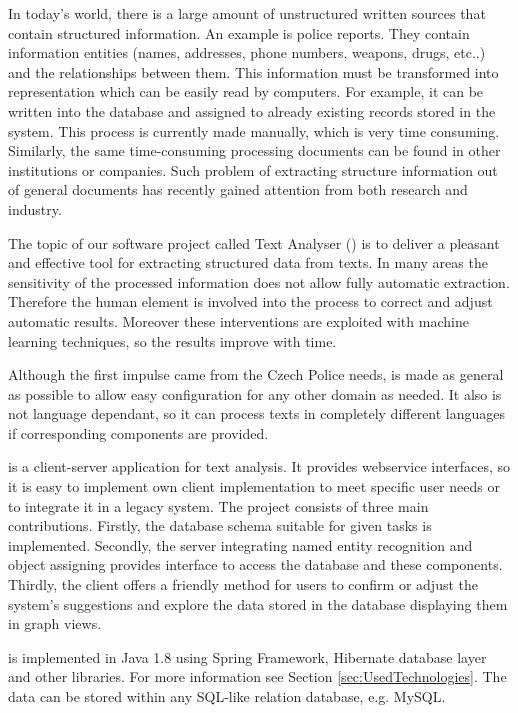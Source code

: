 
In today's world, there is a large amount of unstructured written sources that contain structured information. An example is police reports. They contain
information entities (names, addresses, phone numbers, weapons, drugs, etc..)
and the relationships between them. This information must be transformed into
representation which can be easily read by computers. For example, it can be
written into the database and assigned to already existing records stored in
the system. This process is currently made manually, which is very time 
consuming. Similarly, the same time-consuming processing documents can be found
in other institutions or companies. Such problem of extracting structure
information out of general documents has recently gained attention from both
research and industry.

The topic of our software project called Text Analyser (\textan{}) is to
deliver a pleasant and effective tool for extracting structured data from texts.
In many areas the sensitivity of the processed information does not allow fully
automatic extraction. Therefore the human element is involved into the process
to correct and adjust automatic results. Moreover these interventions are
exploited with machine learning techniques, so the results improve with time.

Although the first impulse came from the Czech Police needs, \textan{} is made
as general as possible to allow easy configuration for any other domain as
needed. It also is not language dependant, so it can process texts in completely
different languages if corresponding components are provided.


\textan{} is a client-server application for text analysis. It provides
webservice interfaces, so it is easy to implement own client implementation to
meet specific user needs or to integrate it in a legacy system. The project
consists of three main contributions. Firstly, the database schema suitable for
given tasks is implemented. Secondly, the server integrating named entity
recognition and object assigning provides interface to access the database and
these components. Thirdly, the client offers a friendly method for users to
confirm or adjust the system's suggestions and explore the data stored in the
database displaying them in graph views.

\textan{} is implemented in Java 1.8 using Spring Framework, Hibernate database
layer and other libraries. For more information see Section
\ref{sec:UsedTechnologies}. The data can be stored within any SQL-like relation
database, e.g. MySQL.
